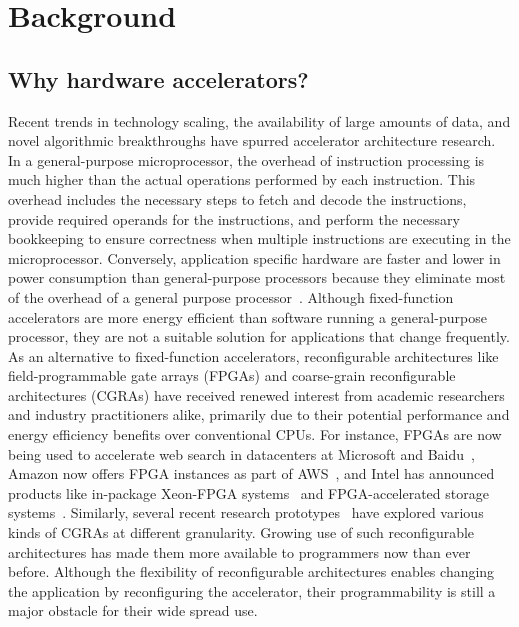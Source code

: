 
\chapter{Background}
\label{chapter:background}

\section{Why hardware accelerators?}
\label{background:accel}


Recent trends in technology scaling, the availability of large amounts of data, and novel algorithmic breakthroughs have spurred accelerator architecture research.
In a general-purpose microprocessor, the overhead of instruction processing is much higher than the actual operations performed by each instruction.
This overhead includes the necessary steps to fetch and decode the instructions, provide required operands for the instructions, and perform the necessary bookkeeping to ensure correctness when multiple instructions are executing in the microprocessor.
Conversely, application specific hardware are faster and lower in power consumption than general-purpose processors because they eliminate most of the overhead of a general purpose processor~\cite{chung_micro_2010, hameed_asplos_2010_understanding}.
Although fixed-function accelerators are more energy efficient than software running a general-purpose processor, they are not a suitable solution for applications that change frequently.
As an alternative to fixed-function accelerators, reconfigurable architectures like field-programmable gate arrays (FPGAs) and coarse-grain reconfigurable architectures (CGRAs) have received renewed interest from academic researchers and industry practitioners alike, primarily due to their potential performance and energy efficiency benefits over conventional CPUs.
For instance, FPGAs are now being used to accelerate web search in datacenters at Microsoft and Baidu~\cite{catapult, baidu}, Amazon now offers FPGA instances as part of AWS~\cite{awsf1}, and Intel has announced products like in-package Xeon-FPGA systems~\cite{harp} and FPGA-accelerated storage systems~\cite{nand_flash}. Similarly, several recent research prototypes~\cite{dyser, triggered_instruction, scaledeep, scnn, plasticine, cgra_me} have explored various kinds of CGRAs at different granularity. Growing use of such reconfigurable architectures has made them more available to programmers now than ever before.
Although the flexibility of reconfigurable architectures enables changing the application by reconfiguring the accelerator, their programmability is still a major obstacle for their wide spread use.

